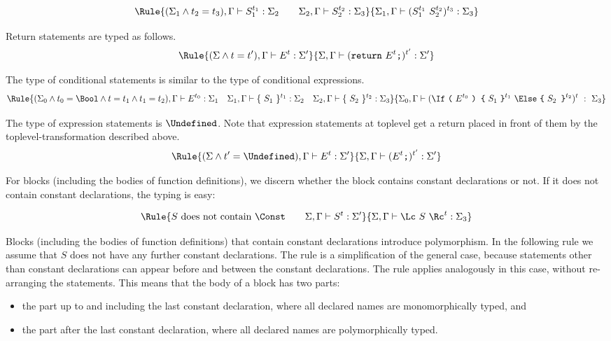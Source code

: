 \[
\Rule{
  (\Sigma_1 \wedge t_2 = t_3), \Gamma \vdash S_1^{t_1} : \Sigma_2 \qquad 
  \Sigma_2, \Gamma \vdash S_2^{t_2} : \Sigma_3}{
\Sigma_1, \Gamma \vdash (S_1^{t_1}\ S_2^{t_2})^{t_3}  : \Sigma_3}
\]

\noindent
Return statements are typed as follows.
\[
\Rule{
(\Sigma \wedge t = t'), \Gamma \vdash E^{t} : \Sigma' }{
\Sigma, \Gamma \vdash (\texttt{return}\ E^{t} \texttt{;})^{t'} : \Sigma'}
\]

\noindent
The type of conditional statements is similar to the type of conditional expressions.
\[\Rule{(\Sigma_0 \wedge t_0 = \Bool \wedge t = t_1 \wedge t_1 = t_2),
          \Gamma \vdash E^{t_0} : \Sigma_1 \quad
\Sigma_1, \Gamma \vdash \{\ S_1\ \}^{t_1} : \Sigma_2 \quad
\Sigma_2, \Gamma \vdash \{\ S_2\ \}^{t_2} : \Sigma_3 }{
  \Sigma_0, \Gamma \vdash (\If\ \texttt{(}\ E^{t_0}\ \texttt{)\ \{}\ S_1\ \texttt{\}}^{t_1}\ \Else\ \texttt{\{}\ S_2\texttt{ \}}^{t_2})^t\ :\ \Sigma_3}
\]


\noindent
The type of expression statements is $\Undefined$. Note that expression statements
at toplevel get a return placed in front of them by the toplevel-transformation described above.
\[
\Rule{
(\Sigma \wedge t' = \Undefined), \Gamma \vdash E^{t} : \Sigma' }{
\Sigma, \Gamma \vdash (E^{t} \texttt{;})^{t'} : \Sigma'}
\]

\noindent
For blocks (including the bodies of function definitions), we discern whether the
block contains constant declarations or not. If it does not contain constant
declarations, the typing is easy:

\[
\Rule{
  S\ \textrm{does not contain }\Const \qquad
  \Sigma, \Gamma \vdash S^{t} : \Sigma' }{
\Sigma, \Gamma \vdash \Lc \ S \ \Rc^{t}  : \Sigma_3}
\]

\noindent
Blocks (including the bodies of function definitions) that 
contain constant declarations introduce polymorphism. In the following
rule we assume that $S$ does not have any further constant declarations. The rule
is a simplification of the general case, because statements other than constant
declarations can appear before and between the constant declarations. The rule
applies analogously in this case, without re-arranging the statements. This means
that the body of a block has two parts:
\begin{itemize}
\item the part up to and including the last constant declaration, where all
  declared names are monomorphically typed, and
\item the part after the last constant declaration, where all declared names
  are polymorphically typed.
\end{itemize}

